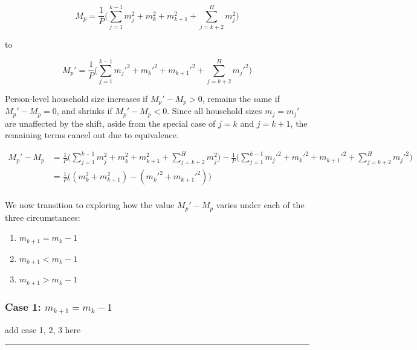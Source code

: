 \documentclass[
]{article}
\providecommand{\tightlist}{%
  \setlength{\itemsep}{0pt}\setlength{\parskip}{0pt}}
\begin{document}
\begin{equation}
M_p =\frac{1}{P} \bigg( \sum_{j = 1}^{k-1} m_j^2 + m_k^2 + m_{k+1}^2 +  \sum_{j = k+2}^{H}m_j^2 \bigg)
\end{equation}

to

\begin{equation}
M_p' =\frac{1}{P} \bigg( \sum_{j = 1}^{k-1} m_j'^2 + m_k'^2 + m_{k+1}'^2 + \sum_{j = k+2}^{H}m_j'^2 \bigg)
\end{equation}

Person-level household size increases if \(M_p' - M_p > 0\), remains the
same if \(M_p' - M_p = 0\), and shrinks if \(M_p' - M_p < 0\). Since all
household sizes \(m_j = m_j'\) are unaffected by the shift, aside from
the special case of \(j = k\) and \(j = k+1\), the remaining terms
cancel out due to equivalence.

\begin{align}
M_p' - M_p & = \frac{1}{P} \bigg( \sum_{j = 1}^{k-1} m_j^2 + m_k^2 + m_{k+1}^2 +  \sum_{j = k+2}^{H}m_j^2 \bigg) - \frac{1}{P} \bigg( \sum_{j = 1}^{k-1} m_j'^2 + m_k'^2 + m_{k+1}'^2 + \sum_{j = k+2}^{H}m_j'^2 \bigg) \\
\label{eq:3}
\tag{3}
& = \frac{1}{P} \bigg( (m_k^2 + m_{k+1}^2) - (m_k'^2 + m_{k+1}'^2) \bigg) \\
\end{align}

We now transition to exploring how the value \(M_p' - M_p\) varies under
each of the three circumstances:

\begin{enumerate}
\def\labelenumi{\arabic{enumi}.}
\tightlist
\item
  \(m_{k+1} = m_k - 1\)
\item
  \(m_{k+1} < m_k - 1\)
\item
  \(m_{k+1} > m_k - 1\)
\end{enumerate}

\hypertarget{case-1-m_k1-m_k---1}{%
\subsubsection{\texorpdfstring{Case 1:
\(m_{k+1} = m_k - 1\)}{Case 1: m\_\{k+1\} = m\_k - 1}}\label{case-1-m_k1-m_k---1}}

add case 1, 2, 3 here

\begin{center}\rule{0.5\linewidth}{0.5pt}\end{center}
\end{document}
